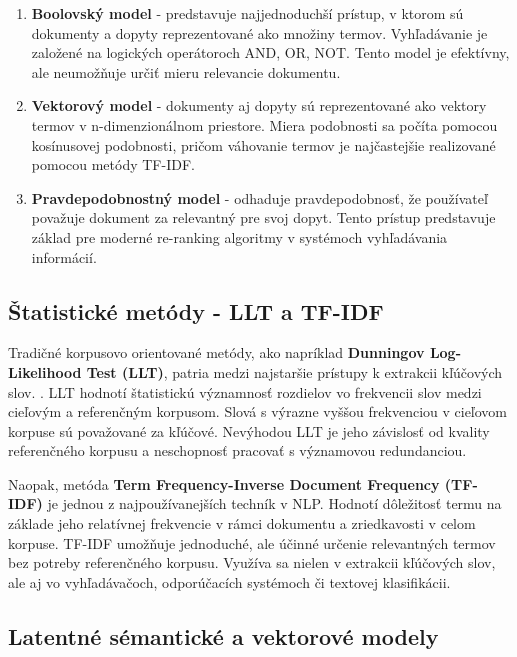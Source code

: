\documentclass[a4paper,12pt]{article}
\begin{document}
\begin{enumerate}
    \item \textbf{Boolovský model} - predstavuje najjednoduchší prístup, v ktorom sú dokumenty a dopyty reprezentované ako množiny termov. Vyhľadávanie je založené na logických operátoroch AND, OR, NOT. Tento model je efektívny, ale neumožňuje určiť mieru relevancie dokumentu.
    
    \item \textbf{Vektorový model} - dokumenty aj dopyty sú reprezentované ako vektory termov v n-dimenzionálnom priestore. Miera podobnosti sa počíta pomocou kosínusovej podobnosti, pričom váhovanie termov je najčastejšie realizované pomocou metódy TF-IDF.
    
    \item \textbf{Pravdepodobnostný model} - odhaduje pravdepodobnosť, že používateľ považuje dokument za relevantný pre svoj dopyt. Tento prístup predstavuje základ pre moderné re-ranking algoritmy v systémoch vyhľadávania informácií.
\end{enumerate}

\subsection{Štatistické metódy - LLT a TF-IDF}

Tradičné korpusovo orientované metódy, ako napríklad \textbf{Dunningov Log-Likelihood Test (LLT)}, patria medzi najstaršie prístupy k extrakcii kľúčových slov. \cite{dunning1993accurate}. LLT hodnotí štatistickú významnosť rozdielov vo frekvencii slov medzi cieľovým a referenčným korpusom. Slová s výrazne vyššou frekvenciou v cieľovom korpuse sú považované za kľúčové. Nevýhodou LLT je jeho závislosť od kvality referenčného korpusu a neschopnosť pracovať s významovou redundanciou.

Naopak, metóda \textbf{Term Frequency-Inverse Document Frequency (TF-IDF)} \cite{salton1988term} je jednou z najpoužívanejších techník v NLP. Hodnotí dôležitosť termu na základe jeho relatívnej frekvencie v rámci dokumentu a zriedkavosti v celom korpuse. TF-IDF umožňuje jednoduché, ale účinné určenie relevantných termov bez potreby referenčného korpusu. Využíva sa nielen v extrakcii kľúčových slov, ale aj vo vyhľadávačoch, odporúčacích systémoch či textovej klasifikácii.

\subsection{Latentné sémantické a vektorové modely}
\end{document}
